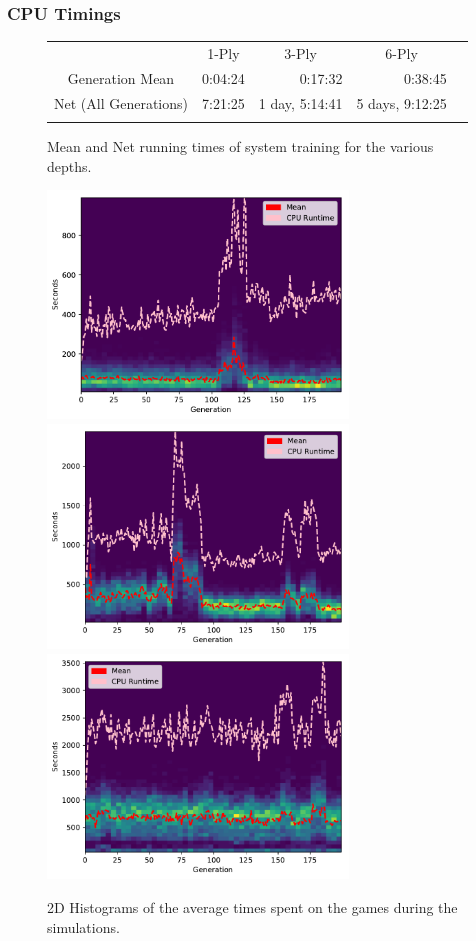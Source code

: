 \documentclass{beamer}
\begin{document}
  \begin{frame}
    \frametitle{CPU Timings} 
    \begin{figure}
        \begin{tabular}{ccccc}
          & 1-Ply        & 3-Ply          & 6-Ply          & \\ \cline{2-4}
    \multicolumn{1}{c|}{Generation Mean} & \multicolumn{1}{r|}{0:04:24} & \multicolumn{1}{r|}{0:17:32}  & \multicolumn{1}{r|}{0:38:45}   & \\ \cline{2-4}
    \multicolumn{1}{c|}{Net (All Generations)} & \multicolumn{1}{r|}{7:21:25} & \multicolumn{1}{r|}{1 day, 5:14:41} & \multicolumn{1}{r|}{5 days, 9:12:25} & \\ \cline{2-4}
          &          &           &            & 
    \end{tabular}

    \caption{Mean and Net running times of system training for the various depths. \label{cpu_table}}
    \end{figure}


    \begin{figure}[!ht]
    \centering
    \includegraphics[width=80mm]{images/results/1ply/simulation_timings.pdf}
    \includegraphics[width=80mm]{images/results/3ply/simulation_timings.pdf}
    \includegraphics[width=80mm]{images/results/6ply/simulation_timings.pdf}
    \caption{2D Histograms of the average times spent on the games during the simulations. \label{chart_cpu_times}}
    \end{figure}
  \end{frame}
    
\end{document}
